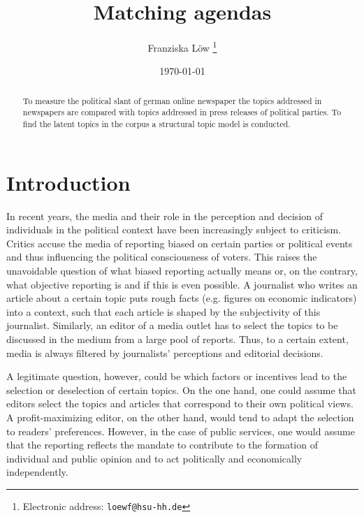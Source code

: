 \documentclass[12pt,a4paper,notitlepage]{article}
\title{Matching agendas}
\date{\today}
\author{Franziska Löw
  \thanks{Electronic address: \texttt{loewf@hsu-hh.de}}}
\affil{Department of Industrial Economics,\\ Helmut Schmidt University,\\ Hamburg, Germany}
\begin{document}
\begin{titlepage}
	\maketitle
	\begin{abstract}
	To measure the political slant of german online newspaper the topics addressed in newspapers are compared with topics addressed in press releases of political parties. To find the latent topics in the corpus a structural topic model is conducted. 

	\end{abstract}

\end{titlepage}

\tableofcontents

\pagebreak


\section{Introduction}

In recent years, the media and their role in the perception and decision of individuals in the political context have been increasingly subject to criticism. Critics accuse the media of reporting biased on certain parties or political events and thus influencing the political consciousness of voters. This raises the unavoidable question of what biased reporting actually means or, on the contrary, what objective reporting is and if this is even possible. A journalist who writes an article about a certain topic puts rough facts (e.g. figures on economic indicators) into a context, such that each article is shaped by the subjectivity of this journalist. Similarly, an editor of a media outlet has to select the topics to be discussed in the medium from a large pool of reports. Thus, to a certain extent, media is always filtered by journalists' perceptions and editorial decisions. 

A legitimate question, however, could be which factors or incentives lead to the selection or deselection of certain topics. On the one hand, one could assume that editors select the topics and articles that correspond to their own political views. A profit-maximizing editor, on the other hand, would tend to adapt the selection to readers' preferences. However, in the case of public services, one would assume that the reporting reflects the mandate to contribute to the formation of individual and public opinion and to act politically and economically independently.
\end{document}
